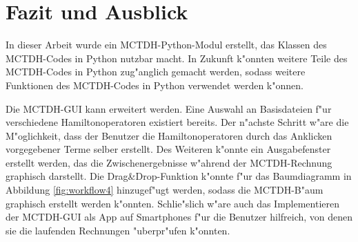 \chapter{Fazit und Ausblick}

In dieser Arbeit wurde ein MCTDH-Python-Modul erstellt, das Klassen des MCTDH-Codes in Python nutzbar macht.
In Zukunft k"onnten weitere Teile des MCTDH-Codes in Python zug"anglich gemacht werden, sodass weitere Funktionen
des MCTDH-Codes in Python verwendet werden k"onnen.


Die MCTDH-GUI kann erweitert werden. Eine Auswahl an Basisdateien f"ur verschiedene Hamiltonoperatoren existiert bereits. Der n"achste Schritt
w"are die M"oglichkeit, dass der Benutzer die Hamiltonoperatoren durch das Anklicken vorgegebener Terme selber erstellt. 
Des Weiteren k"onnte ein Ausgabefenster erstellt werden, das die Zwischenergebnisse w"ahrend der MCTDH-Rechnung graphisch darstellt.
Die Drag\&Drop-Funktion k"onnte f"ur das Baumdiagramm in Abbildung \ref{fig:workflow4} hinzugef"ugt werden, sodass die MCTDH-B"aum
graphisch erstellt werden k"onnten.
Schlie"slich w"are auch das Implementieren der MCTDH-GUI als App auf Smartphones f"ur die Benutzer hilf\-reich, 
von denen sie die laufenden Rechnungen
"uberpr"ufen k"onnten. 